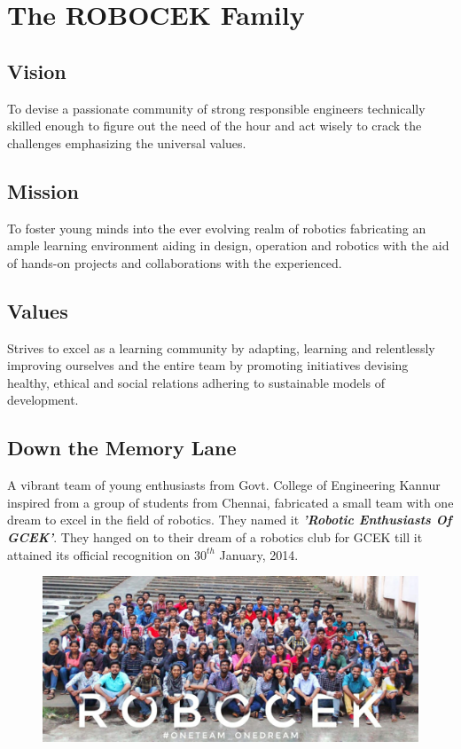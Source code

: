 \cleardoublepage
\chapter{The ROBOCEK Family}
\section{Vision}
\justify
    To devise a passionate community of strong responsible engineers technically skilled enough to figure out the need of the hour and act wisely to crack the challenges emphasizing the universal values.
\section{Mission}
    To foster young minds into the ever evolving realm of robotics fabricating an ample learning environment aiding in design, operation and robotics with the aid of hands-on projects and collaborations with the experienced. 
\section{Values}
    Strives to excel as a learning community by adapting, learning and relentlessly improving ourselves and the entire team by promoting initiatives devising healthy, ethical and social relations adhering to sustainable models of development. 

\section{Down the Memory Lane}
\justify
A vibrant team of young enthusiasts from Govt. College of Engineering Kannur inspired from a group of students from Chennai, fabricated a small team with one dream to excel in the field of robotics. They named it \textit{\textbf{'Robotic Enthusiasts Of GCEK'}}. They hanged on to their dream of a robotics club for GCEK till it attained its official recognition on $30^{th}$ January, 2014.

\begin{figure}
    \centering
    \includegraphics{Images/robocek.jpeg}
\end{figure}

